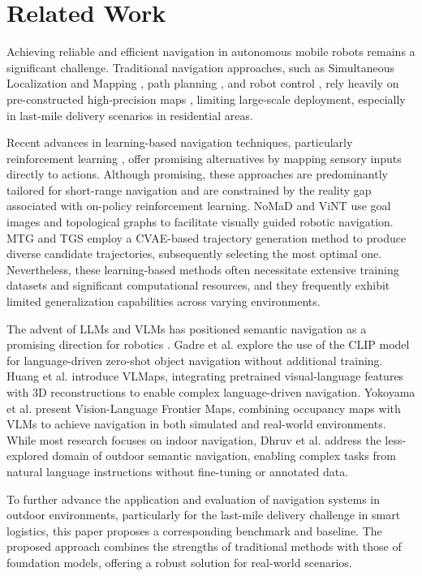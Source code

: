 \section{Related Work}
Achieving reliable and efficient navigation in autonomous mobile robots remains a significant challenge. Traditional navigation approaches, such as Simultaneous Localization and Mapping \cite{Cadena2016}, path planning \cite{SnchezIbez2021}, and robot control \cite{Tzafestas2018}, rely heavily on pre-constructed high-precision maps \cite{Skog2009}, limiting large-scale deployment, especially in last-mile delivery scenarios in residential areas.

Recent advances in learning-based navigation techniques, particularly reinforcement learning \cite{Hao2024,Liang2020}, offer promising alternatives by mapping sensory inputs directly to actions. Although promising, these approaches are predominantly tailored for short-range navigation and are constrained by the reality gap associated with on-policy reinforcement learning. NoMaD and ViNT \cite{sridhar2023nomad,shah2023vint} use goal images and topological graphs to facilitate visually guided robotic navigation. MTG and TGS \cite{Liang2024,tgs2024} employ a CVAE-based trajectory generation method to produce diverse candidate trajectories, subsequently selecting the most optimal one. Nevertheless, these learning-based methods often necessitate extensive training datasets and significant computational resources, and they frequently exhibit limited generalization capabilities across varying environments.

The advent of LLMs and VLMs has positioned semantic navigation as a promising direction for robotics \cite{VLA2024,Wang2024}. Gadre et al. \cite{cows} explore the use of the CLIP \cite{pmlr-v139-radford21a} model for language-driven zero-shot object navigation without additional training. Huang et al. \cite{Huang2023} introduce VLMaps, integrating pretrained visual-language features with 3D reconstructions to enable complex language-driven navigation. Yokoyama et al. \cite{Yokoyama2024} present Vision-Language Frontier Maps, combining occupancy maps with VLMs to achieve navigation in both simulated and real-world environments. While most research focuses on indoor navigation, Dhruv et al. \cite{shah2023lm} address the less-explored domain of outdoor semantic navigation, enabling complex tasks from natural language instructions without fine-tuning or annotated data.

To further advance the application and evaluation of navigation systems in outdoor environments, particularly for the last-mile delivery challenge in smart logistics, this paper proposes a corresponding benchmark and baseline. The proposed approach combines the strengths of traditional methods with those of foundation models, offering a robust solution for real-world scenarios.